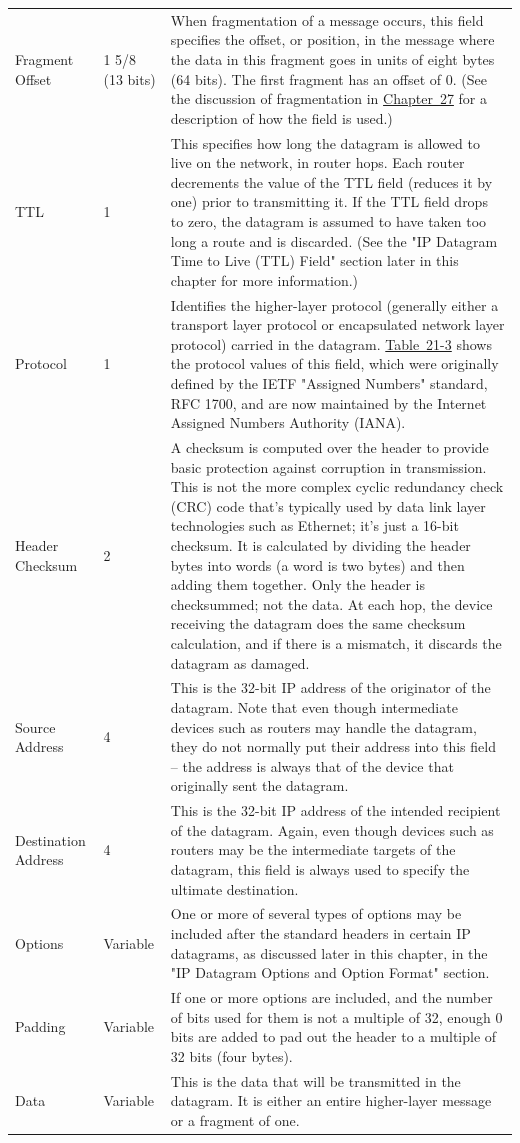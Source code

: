 \documentclass[b5paper,11pt]{memoir}
\begin{document}
\begin{longtable}[]{@{}lll@{}}
Fragment Offset & 1 5/8 (13 bits) & When fragmentation of a message
occurs, this field specifies the offset, or position, in the message
where the data in this fragment goes in units of eight bytes (64 bits).
The first fragment has an offset of 0. (See the discussion of
fragmentation in \protect\hyperlink{ch27.html}{Chapter~27} for a
description of how the field is used.)\tabularnewline
TTL & 1 & This specifies how long the datagram is allowed to live on the
network, in router hops. Each router decrements the value of the TTL
field (reduces it by one) prior to transmitting it. If the TTL field
drops to zero, the datagram is assumed to have taken too long a route
and is discarded. (See the "IP Datagram Time to Live (TTL) Field"
section later in this chapter for more information.)\tabularnewline
Protocol & 1 & Identifies the higher-layer protocol (generally either a
transport layer protocol or encapsulated network layer protocol) carried
in the datagram.
\protect\hyperlink{ch21s02.htmlux5cux23ipv_protocol_subfields}{Table~21-3}
shows the protocol values of this field, which were originally defined
by the IETF "Assigned Numbers" standard, RFC 1700, and are now
maintained by the Internet Assigned Numbers Authority
(IANA).\tabularnewline
Header Checksum & 2 & A checksum is computed over the header to provide
basic protection against corruption in transmission. This is not the
more complex cyclic redundancy check (CRC) code that's typically used by
data link layer technologies such as Ethernet; it's just a 16-bit
checksum. It is calculated by dividing the header bytes into words (a
word is two bytes) and then adding them together. Only the header is
checksummed; not the data. At each hop, the device receiving the
datagram does the same checksum calculation, and if there is a mismatch,
it discards the datagram as damaged.\tabularnewline
Source Address & 4 & This is the 32-bit IP address of the originator of
the datagram. Note that even though intermediate devices such as routers
may handle the datagram, they do not normally put their address into
this field -- the address is always that of the device that originally
sent the datagram.\tabularnewline
Destination Address & 4 & This is the 32-bit IP address of the intended
recipient of the datagram. Again, even though devices such as routers
may be the intermediate targets of the datagram, this field is always
used to specify the ultimate destination.\tabularnewline
Options & Variable & One or more of several types of options may be
included after the standard headers in certain IP datagrams, as
discussed later in this chapter, in the "IP Datagram Options and Option
Format" section.\tabularnewline
Padding & Variable & If one or more options are included, and the number
of bits used for them is not a multiple of 32, enough 0 bits are added
to pad out the header to a multiple of 32 bits (four
bytes).\tabularnewline
Data & Variable & This is the data that will be transmitted in the
datagram. It is either an entire higher-layer message or a fragment of
one.\tabularnewline
\bottomrule
\end{longtable}
\end{document}
